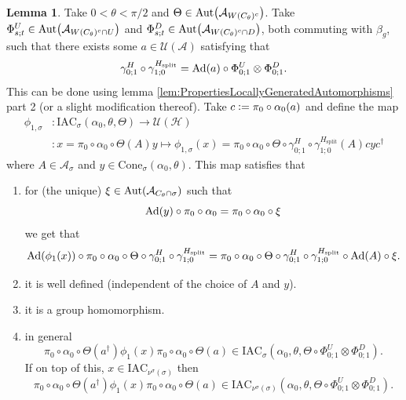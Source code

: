 \documentclass[12pt,a4paper,twoside]{article}
\newcommand{\IAC}{\textrm{IAC}}
\newcommand{\defeq}{\vcentcolon=}
\let\originalleft\left
\let\originalright\right
\renewcommand{\left}{\mathopen{}\mathclose\bgroup\originalleft}
\renewcommand{\right}{\aftergroup\egroup\originalright}
\newcommand{\UU}{\mathcal U}
\newcommand{\HH}{\mathcal H}
\renewcommand{\AA}{\mathcal A}
\newcommand{\Ad}[1]{\textrm{Ad}\left(#1\right)}
\newcommand{\Aut}[1]{\textrm{Aut}\left(#1\right)}
\theoremstyle{definition}
\newtheorem{lemma}[theorem]{Lemma}
\numberwithin{equation}{section}
\begin{document}
\begin{lemma}\label{lem:DefinitionOfGroupMorphismTwoTranslations}
	Take $0<\theta<\pi/2$ and $\Theta\in \Aut{\AA_{W(C_\theta)^c}}$. Take $\Phi^U_{s;t}\in\Aut{\AA_{W(C_\theta)^c\cap U}}$ and $\Phi^D_{s;t}\in\Aut{\AA_{W(C_\theta)^c\cap D}}$, both commuting with $\beta_g$, such that there exists some $a\in\UU(\AA)$ satisfying that
	\begin{equation}\label{eq:DefinitionOfGroupMorphismHAutEquationTwoTranslations}
		\gamma^H_{0;1}\circ\gamma^{H_{\text{split}}}_{1;0}=\Ad{a}\circ \Phi^U_{0;1}\otimes\Phi^D_{0;1}.
	\end{equation}
	This can be done using lemma \ref{lem:PropertiesLocallyGeneratedAutomorphisms} part 2 (or a slight modification thereof). Take $c\defeq \pi_0\circ\alpha_0(a)$ and define the map
	\begin{align}
		\phi_{1,\sigma}&:\IAC_{\sigma}(\alpha_0,\theta,\Theta) \rightarrow \UU(\HH)\\
		\nonumber
		&:x=\pi_0\circ\alpha_0\circ\Theta(A)y\mapsto \phi_{1,\sigma}(x)=\pi_0\circ\alpha_0\circ\Theta\circ\gamma^H_{0;1}\circ\gamma^{H_{\text{split}}}_{1;0}(A)cyc^\dagger
	\end{align}
	where $A\in\AA_{\sigma}$ and $y\in\textrm{Cone}_{\sigma}(\alpha_0,\theta)$. This map satisfies that
	\begin{enumerate}
		\item  for (the unique) $\xi\in\Aut{\AA_{C_\theta\cap \sigma}}$ such that
		\begin{equation}
			\Ad{y}\circ\pi_0\circ\alpha_0=\pi_0\circ\alpha_0\circ\xi
		\end{equation}
		we get that
		\begin{equation}\label{eq:ConditionDefinitionOfGroupMorphismTwoTranslations}
			\Ad{\phi_1(x)}\circ\pi_0\circ\alpha_0\circ\Theta\circ\gamma^H_{0;1}\circ\gamma^{H_{\text{split}}}_{1;0}=\pi_0\circ\alpha_0\circ\Theta\circ\gamma^H_{0;1}\circ\gamma^{H_{\text{split}}}_{1;0}\circ\Ad{A}\circ\xi.
		\end{equation}
		\item it is well defined (independent of the choice of $A$ and $y$).
		\item it is a group homomorphism.
		\item in general
			\begin{equation}
				\pi_0\circ\alpha_0\circ\Theta(a^\dagger)\phi_1(x)\pi_0\circ\alpha_0\circ\Theta(a)\in\IAC_\sigma(\alpha_0,\theta,\Theta\circ \Phi^U_{0;1}\otimes\Phi^D_{0;1}).
			\end{equation}
			If on top of this, $x\in\IAC_{\nu^\sigma(\sigma)}$ then
			\begin{equation}
				\pi_0\circ\alpha_0\circ\Theta(a^\dagger)\phi_1(x)\pi_0\circ\alpha_0\circ\Theta(a)\in\IAC_{\nu^\sigma(\sigma)}(\alpha_0,\theta,\Theta\circ \Phi^U_{0;1}\otimes\Phi^D_{0;1}).
			\end{equation}
	\end{enumerate}
\end{lemma}
\end{document}
